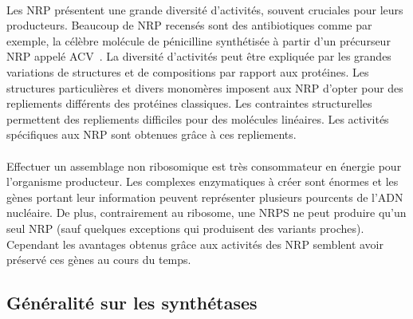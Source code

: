 \documentclass[12pt,french,twoside]{report}
\begin{document}
\paragraph{}Les NRP présentent une grande diversité d'activités, souvent cruciales pour leurs producteurs.
Beaucoup de NRP recensés sont des antibiotiques comme par exemple, la célèbre molécule de pénicilline synthétisée à partir d'un précurseur NRP appelé ACV~\cite{queener_molecular_1990}.
La diversité d'activités peut être expliquée par les grandes variations de structures et de compositions par rapport aux protéines.
Les structures particulières et divers monomères imposent aux NRP d'opter pour des repliements différents des protéines classiques.
Les contraintes structurelles permettent des repliements difficiles pour des molécules linéaires.
Les activités spécifiques aux NRP sont obtenues grâce à ces repliements.

\paragraph{}Effectuer un assemblage non ribosomique est très consommateur en énergie pour l'organisme producteur.
Les complexes enzymatiques à créer sont énormes et les gènes portant leur information peuvent représenter plusieurs pourcents de l'ADN nucléaire.
De plus, contrairement au ribosome, une NRPS ne peut produire qu'un seul NRP (sauf quelques exceptions qui produisent des variants proches).
Cependant les avantages obtenus grâce aux activités des NRP semblent avoir préservé ces gènes au cours du temps.


\subsection{Généralité sur les synthétases}
\end{document}
